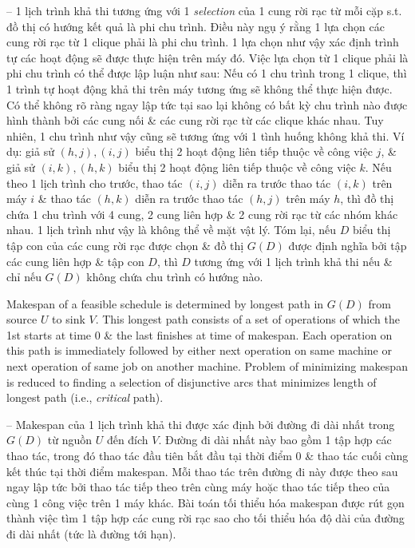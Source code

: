 \documentclass{article}
\begin{document}
\begin{itemize}
\begin{itemize}
        -- 1 lịch trình khả thi tương ứng với 1 {\it selection} của 1 cung rời rạc từ mỗi cặp s.t. đồ thị có hướng kết quả là phi chu trình. Điều này ngụ ý rằng 1 lựa chọn các cung rời rạc từ 1 clique phải là phi chu trình. 1 lựa chọn như vậy xác định trình tự các hoạt động sẽ được thực hiện trên máy đó. Việc lựa chọn từ 1 clique phải là phi chu trình có thể được lập luận như sau: Nếu có 1 chu trình trong 1 clique, thì 1 trình tự hoạt động khả thi trên máy tương ứng sẽ không thể thực hiện được. Có thể không rõ ràng ngay lập tức tại sao lại không có bất kỳ chu trình nào được hình thành bởi các cung nối \& các cung rời rạc từ các clique khác nhau. Tuy nhiên, 1 chu trình như vậy cũng sẽ tương ứng với 1 tình huống không khả thi. Ví dụ: giả sử $(h,j),(i,j)$ biểu thị 2 hoạt động liên tiếp thuộc về công việc $j$, \& giả sử $(i,k),(h,k)$ biểu thị 2 hoạt động liên tiếp thuộc về công việc $k$. Nếu theo 1 lịch trình cho trước, thao tác $(i,j)$ diễn ra trước thao tác $(i,k)$ trên máy $i$ \& thao tác $(h,k)$ diễn ra trước thao tác $(h,j)$ trên máy $h$, thì đồ thị chứa 1 chu trình với 4 cung, 2 cung liên hợp \& 2 cung rời rạc từ các nhóm khác nhau. 1 lịch trình như vậy là không thể về mặt vật lý. Tóm lại, nếu $D$ biểu thị tập con của các cung rời rạc được chọn \& đồ thị $G(D)$ được định nghĩa bởi tập các cung liên hợp \& tập con $D$, thì $D$ tương ứng với 1 lịch trình khả thi nếu \& chỉ nếu $G(D)$ không chứa chu trình có hướng nào.

        Makespan of a feasible schedule is determined by longest path in $G(D)$ from source $U$ to sink $V$. This longest path consists of a set of operations of which the 1st starts at time 0 \& the last finishes at time of makespan. Each operation on this path is immediately followed by either next operation on same machine or next operation of same job on another machine. Problem of minimizing makespan is reduced to finding a selection of disjunctive arcs that minimizes length of longest path (i.e., {\it critical} path).

        -- Makespan của 1 lịch trình khả thi được xác định bởi đường đi dài nhất trong $G(D)$ từ nguồn $U$ đến đích $V$. Đường đi dài nhất này bao gồm 1 tập hợp các thao tác, trong đó thao tác đầu tiên bắt đầu tại thời điểm 0 \& thao tác cuối cùng kết thúc tại thời điểm makespan. Mỗi thao tác trên đường đi này được theo sau ngay lập tức bởi thao tác tiếp theo trên cùng máy hoặc thao tác tiếp theo của cùng 1 công việc trên 1 máy khác. Bài toán tối thiểu hóa makespan được rút gọn thành việc tìm 1 tập hợp các cung rời rạc sao cho tối thiểu hóa độ dài của đường đi dài nhất (tức là đường tới hạn).


\end{itemize}
\end{itemize}
\end{document}
